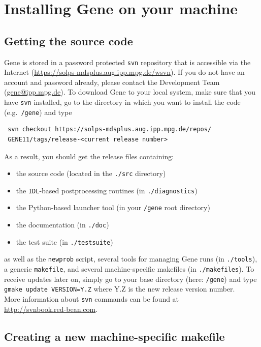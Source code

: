 \documentclass[12pt]{article}
\begin{document}
\newpage

\section{Installing Gene on your machine}

\subsection{Getting the source code}

{\sc Gene} is stored in a password protected {\tt svn} repository that is accessible via the Internet
(\url{https://solps-mdsplus.aug.ipp.mpg.de/wsvn}). If you do not have an account and password already,
please contact the \gene Development Team (\href{mailto:gene@ipp.mpg.de}{gene@ipp.mpg.de}).
To download {\sc Gene} to your local system, make sure that you have {\tt svn} installed, go to the
directory in which you want to install the code (e.g.~\texttt{/gene}) and type
\begin{verbatim}
 svn checkout https://solps-mdsplus.aug.ipp.mpg.de/repos/
 GENE11/tags/release-<current release number>
\end{verbatim}
As a result, you should get the release files containing:
\begin{itemize}
\item the \gene source code (located in the \texttt{./src} directory)
\item the {\tt IDL}-based postprocessing routines (in \texttt{./diagnostics})
\item the Python-based launcher tool (in your \texttt{/gene} root directory) 
\item the \gene documentation (in \texttt{./doc})
\item the \gene test suite (in \texttt{./testsuite})
\end{itemize}
as well as the {\tt newprob} script, several tools for managing {\sc Gene} runs (in \texttt{./tools}), 
a generic {\tt makefile}, and several machine-specific makefiles (in \texttt{./makefiles}).
To receive updates later on, simply go to your \gene base directory (here: \texttt{/gene}) and type
\verb|gmake update VERSION=Y.Z| where Y.Z is the new release version number. \\
More information about {\tt svn} commands can be found at \\
\url{http://svnbook.red-bean.com}.

\subsection{Creating a new machine-specific makefile}
\end{document}
